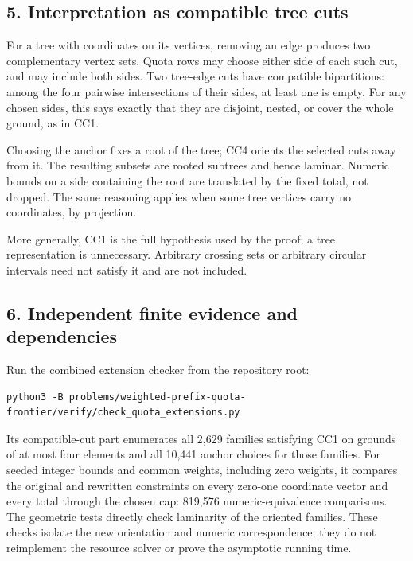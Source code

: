 \hypertarget{af-3beb839889-interpretation-as-compatible-tree-cuts}{%
\subsection{5. Interpretation as compatible tree cuts}\label{af-3beb839889-interpretation-as-compatible-tree-cuts}}

For a tree with coordinates on its vertices, removing an edge produces two complementary vertex sets. Quota rows may choose either side of each such cut, and may include both sides. Two tree-edge cuts have compatible bipartitions: among the four pairwise intersections of their sides, at least one is empty. For any chosen sides, this says exactly that they are disjoint, nested, or cover the whole ground, as in CC1.

Choosing the anchor fixes a root of the tree; CC4 orients the selected cuts away from it. The resulting subsets are rooted subtrees and hence laminar. Numeric bounds on a side containing the root are translated by the fixed total, not dropped. The same reasoning applies when some tree vertices carry no coordinates, by projection.

More generally, CC1 is the full hypothesis used by the proof; a tree representation is unnecessary. Arbitrary crossing sets or arbitrary circular intervals need not satisfy it and are not included.

\hypertarget{af-3beb839889-independent-finite-evidence-and-dependencies}{%
\subsection{6. Independent finite evidence and dependencies}\label{af-3beb839889-independent-finite-evidence-and-dependencies}}

Run the combined extension checker from the repository root:

\begin{verbatim}
python3 -B problems/weighted-prefix-quota-frontier/verify/check_quota_extensions.py
\end{verbatim}

Its compatible-cut part enumerates all 2,629 families satisfying CC1 on grounds of at most four elements and all 10,441 anchor choices for those families. For seeded integer bounds and common weights, including zero weights, it compares the original and rewritten constraints on every zero-one coordinate vector and every total through the chosen cap: 819,576 numeric-equivalence comparisons. The geometric tests directly check laminarity of the oriented families. These checks isolate the new orientation and numeric correspondence; they do not reimplement the resource solver or prove the asymptotic running time.

